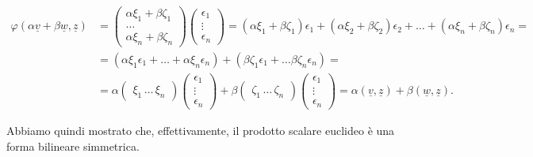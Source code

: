 \begin{align}
    \varphi(\alpha \underline{v} + \beta \underline{w}, \underline{z}) &= \begin{pmatrix}
        \alpha \xi_1 + \beta \zeta_1 \\ \ldots \\ \alpha \xi_n + \beta \zeta_n
    \end{pmatrix} \begin{pmatrix}
        \epsilon_1 \\
        \vdots \\
        \epsilon_n
    \end{pmatrix} = (\alpha \xi_1 + \beta \zeta_1) \epsilon_1 + (\alpha \xi_2 + \beta \zeta_2) \epsilon_2 + \ldots + (\alpha \xi_n + \beta \zeta_n) \epsilon_n = \\
    &= (\alpha \xi_1 \epsilon_1 + \ldots + \alpha \xi_n \epsilon_n) + (\beta \zeta_1 \epsilon_1 + \ldots \beta \zeta_n \epsilon_n) = \\
    &= \alpha \begin{pmatrix}
        \xi_1 \, \ldots \, \xi_n
    \end{pmatrix} \begin{pmatrix}
        \epsilon_1 \\
        \vdots \\
        \epsilon_n
    \end{pmatrix} + \beta \begin{pmatrix}
        \zeta_1 \, \ldots \, \zeta_n
    \end{pmatrix} \begin{pmatrix}
        \epsilon_1 \\
        \vdots \\
        \epsilon_n
    \end{pmatrix} = \alpha (\underline{v}, \underline{z}) + \beta (\underline{w}, \underline{z}).
\end{align}

Abbiamo quindi mostrato che, effettivamente, il prodotto scalare euclideo è una forma bilineare simmetrica.
